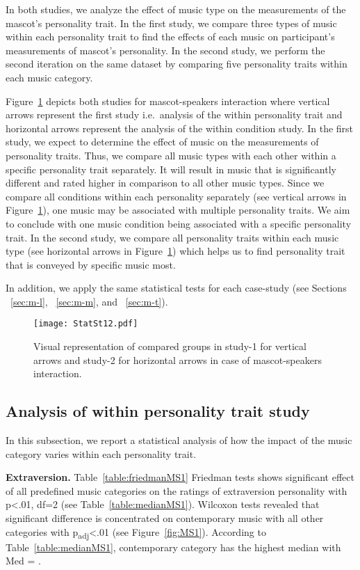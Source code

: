 In both studies, we analyze the effect of music type on the measurements of the mascot’s personality trait.
In the first study, we compare three types of music within each personality trait
to find the effects of each music on participant's measurements of mascot's personality.
In the second study, we perform the second iteration on the same dataset by comparing five personality traits
within each music category.

Figure~\ref{fig:Stat12} depicts both studies for mascot-speakers interaction where vertical arrows represent the first study
i.e.\ analysis of the within personality trait and horizontal arrows represent the analysis of the within condition study.
In the first study, we expect to determine the effect of music on the measurements of personality traits.
Thus, we compare all music types with each other within a specific personality trait separately.
It will result in music that is significantly different and rated higher in comparison to all other music types.
Since we compare all conditions within each personality separately (see vertical arrows in Figure~\ref{fig:Stat12}),
one music may be associated with multiple personality traits.
We aim to conclude with one music condition being associated with a specific personality trait.
In the second study, we compare all personality traits within each music type (see horizontal
arrows in Figure~\ref{fig:Stat12}) which helps us to find personality trait that is conveyed by specific music most.

In addition, we apply the same statistical tests for each case-study
(see Sections ~\ref{sec:m-l}, ~\ref{sec:m-m}, and ~\ref{sec:m-t}).

\begin{figure}[!htb]
    \centering
    \texttt{[image: StatSt12.pdf]}
    \caption{Visual representation of compared groups in study-1 for vertical arrows and
    study-2 for horizontal arrows in case of mascot-speakers interaction.}
    \label{fig:Stat12}
\end{figure}
\subsection{Analysis of within personality trait study}
\label{subsec:MSstudy1}
In this subsection, we report a statistical analysis of how the impact of the music category varies within each
personality trait.

\par\textbf{Extraversion.}
Table~\ref{table:friedmanMS1} Friedman tests shows significant effect of all predefined music categories on the
ratings of extraversion personality with p<.01, df=2 (see Table~\ref{table:medianMS1}).
Wilcoxon tests revealed that significant difference is concentrated on contemporary music
with all other categories with p\textsubscript{adj}<.01 (see Figure~\ref{fig:MS1}).
According to Table~\ref{table:medianMS1}, contemporary category has the highest median with Med = .

